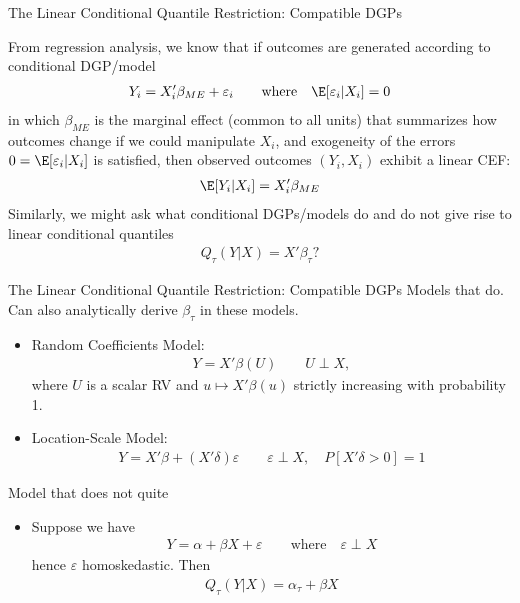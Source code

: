 \documentclass[aspectratio=169, handout]{beamer}
\begin{document}
{\footnotesize
\begin{frame}{The Linear Conditional Quantile Restriction: Compatible DGPs}

From regression analysis, we know that if outcomes are generated
according to conditional DGP/model
\begin{align*}
  Y_i= X_i'\beta_{ME} + \varepsilon_i
  \qquad\text{where}\quad
  \E[\varepsilon_i|X_i] = 0
\end{align*}
in which $\beta_{ME}$ is the marginal effect (common to all units) that
summarizes how outcomes change if we could manipulate $X_i$, and
exogeneity of the errors $0=\E[\varepsilon_i|X_i]$ is satisfied, then
observed outcomes $(Y_i,X_i)$ exhibit a linear CEF:
\begin{align*}
  \E[Y_i|X_i] = X_i'\beta_{ME}
\end{align*}
Similarly, we might ask what conditional DGPs/models do and do not give
rise to linear conditional quantiles
\begin{align*}
  Q_\tau(Y|X) = X'\beta_\tau?
\end{align*}
\end{frame}
}

{\scriptsize
\begin{frame}{The Linear Conditional Quantile Restriction: Compatible DGPs}
Models that \alert{do}.
Can also analytically derive $\beta_\tau$ in these models.
\begin{itemize}
  \item
    \alert{Random Coefficients Model}:
    \begin{align*}
      Y = X'\beta(U)
      \qquad
      U\perp X,
    \end{align*}
    where $U$ is a scalar RV and $u\mapsto X'\beta(u)$ strictly
    increasing with probability 1.

  \pause
  \item \alert{Location-Scale Model}:
    \begin{align*}
      Y = X'\beta + (X'\delta)\varepsilon
      \qquad
      \varepsilon\perp X,
      \quad
      P[X'\delta>0]=1
    \end{align*}
\end{itemize}
\pause
Model that does not quite
\begin{itemize}
  \item
    Suppose we have
    \begin{align*}
      Y = \alpha + \beta X + \varepsilon
      \qquad\text{where}\quad
      \varepsilon\perp X
    \end{align*}
    hence $\varepsilon$ homoskedastic.
    Then
    \begin{align*}
      Q_\tau(Y|X)=\alpha_\tau + \beta X
    \end{align*}
\end{itemize}
\end{frame}
}
\end{document}
